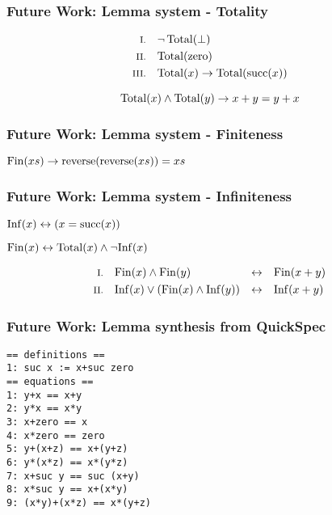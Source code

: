 \documentclass[serif,professionalfont]{beamer}
\begin{document}
\begin{frame}
\frametitle{Future Work: Lemma system - Totality}
\label{sec-6}


\centering
{}

\vspace{\baselineskip}

\begin{align*}
\rom{1} &&        & \neg \, \Total(\bot) \\
\rom{2} &&        & \Total(\fn{zero}) \\
\rom{3} && \fa{x} & \Total(x) \rightarrow \Total(\fn{succ}(x))
\end{align*}

\pause

\begin{equation*}
\faa{x}{y} \Total(x) \wedge \Total(y) \rightarrow x + y = y + x
\end{equation*}
\end{frame}
\begin{frame}
\frametitle{Future Work: Lemma system - Finiteness}
\label{sec-7}


\begin{center}
$\fa{xs} \Fin(xs) \rightarrow \fn{reverse}(\fn{reverse}(xs)) = xs$
\end{center}
\end{frame}
\begin{frame}
\frametitle{Future Work: Lemma system - Infiniteness}
\label{sec-8}


\begin{center}
$\fa{x} \Inf(x) \leftrightarrow (x = \fn{succ}(x))$
\end{center}

\vspace{1\baselineskip}

\pause

\begin{center}
$\Fin(x) \leftrightarrow \Total(x) \wedge \neg \Inf(x)$
\end{center}

\pause

\begin{align*}
\rom{1} && \faa{x}{y} & \Fin(x) \wedge \Fin(y)                & \leftrightarrow &&& \Fin(x + y) \\
\rom{2} && \faa{x}{y} & \Inf(x) \vee (\Fin(x) \wedge \Inf(y)) & \leftrightarrow &&& \Inf(x + y)
\end{align*}
\end{frame}

\begin{frame}[fragile]
\frametitle{Future Work: Lemma synthesis from QuickSpec}
\begin{verbatim}
== definitions ==
1: suc x := x+suc zero
== equations ==
1: y+x == x+y
2: y*x == x*y
3: x+zero == x
4: x*zero == zero
5: y+(x+z) == x+(y+z)
6: y*(x*z) == x*(y*z)
7: x+suc y == suc (x+y)
8: x*suc y == x+(x*y)
9: (x*y)+(x*z) == x*(y+z)
\end{verbatim}
\end{frame}
\end{document}
